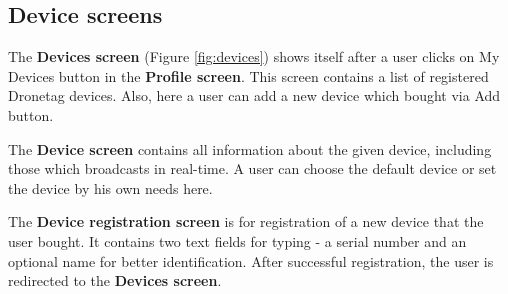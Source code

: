 \subsection{Device screens}\label{subsec:device-screens}
The \textbf{Devices screen} (Figure \ref{fig:devices}) shows itself after a user clicks on My Devices button in the \textbf{Profile screen}.
This screen contains a list of registered Dronetag devices.
Also, here a user can add a new device which bought via Add button.

The \textbf{Device screen} contains all information about the given device, including those which broadcasts in real-time.
A user can choose the default device or set the device by his own needs here.

The \textbf{Device registration screen} is for registration of a new device that the user bought.
It contains two text fields for typing - a serial number and an optional name for better identification.
After successful registration, the user is redirected to the \textbf{Devices screen}.
